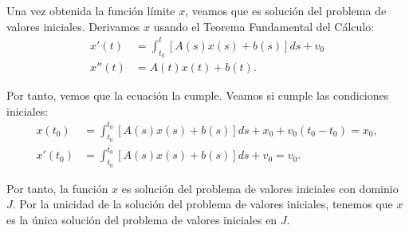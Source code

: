 \begin{ejercicio}
    Una vez obtenida la función límite $x$, veamos que es solución del problema de valores iniciales. Derivamos $x$ usando el Teorema Fundamental del Cálculo:
    \begin{align*}
        x'(t) &= \int_{t_0}^t[A(s)x(s) + b(s)]ds+v_0\\
        x''(t) &= A(t)x(t) + b(t).
    \end{align*}

    Por tanto, vemos que la ecuación la cumple. Veamos si cumple las condiciones iniciales:
    \begin{align*}
        x(t_0) &= \int_{t_0}^{t_0}[A(s)x(s) + b(s)]ds + x_0 + v_0(t_0 - t_0) = x_0,\\
        x'(t_0) &= \int_{t_0}^{t_0}[A(s)x(s) + b(s)]ds + v_0 = v_0.
    \end{align*}

    Por tanto, la función $x$ es solución del problema de valores iniciales con dominio $J$. Por la unicidad de la solución del problema de valores iniciales, tenemos que $x$ es la única solución del problema de valores iniciales en $J$.
\end{ejercicio}

